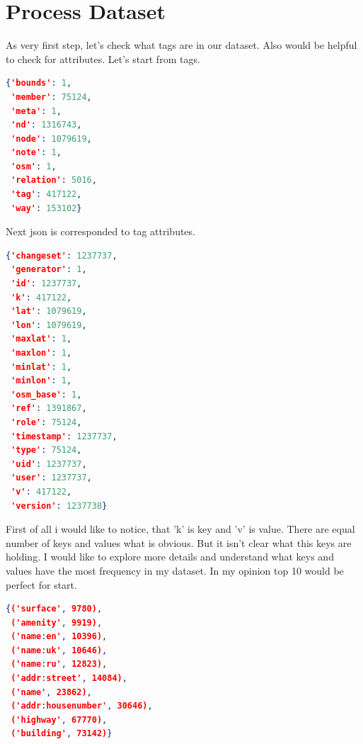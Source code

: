 \documentclass[a4paper,12pt,twoside]{book}
\begin{document}
\section*{Process Dataset}

As very first step, let's check what tags are in our dataset. Also would be helpful to check for attributes. Let's start from tags. 

\begin{lstlisting}[language=json,firstnumber=1]
{'bounds': 1,
 'member': 75124,
 'meta': 1,
 'nd': 1316743,
 'node': 1079619,
 'note': 1,
 'osm': 1,
 'relation': 5016,
 'tag': 417122,
 'way': 153102}
\end{lstlisting}
Next json is corresponded to tag attributes.
\begin{lstlisting}[language=json,firstnumber=1]
{'changeset': 1237737,
 'generator': 1,
 'id': 1237737,
 'k': 417122,
 'lat': 1079619,
 'lon': 1079619,
 'maxlat': 1,
 'maxlon': 1,
 'minlat': 1,
 'minlon': 1,
 'osm_base': 1,
 'ref': 1391867,
 'role': 75124,
 'timestamp': 1237737,
 'type': 75124,
 'uid': 1237737,
 'user': 1237737,
 'v': 417122,
 'version': 1237738}
\end{lstlisting}
First of all i would like to notice, that 'k' is key and 'v' is value. There are equal number of keys and values what is obvious. But it isn't clear what this keys are holding. I would like to explore more details and understand what keys and values have the most frequency in my dataset. In my opinion top 10 would be perfect for start.
\begin{lstlisting}[language=json,firstnumber=1]
{('surface', 9780),
 ('amenity', 9919),
 ('name:en', 10396),
 ('name:uk', 10646),
 ('name:ru', 12823),
 ('addr:street', 14084),
 ('name', 23862),
 ('addr:housenumber', 30646),
 ('highway', 67770),
 ('building', 73142)}
\end{lstlisting}
\end{document}

